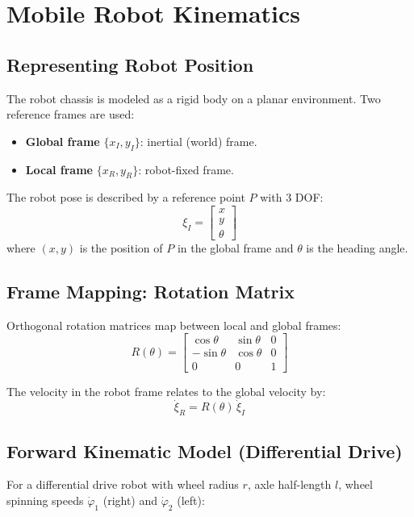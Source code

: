 \documentclass[11pt,a4paper]{article}
\theoremstyle{definition}
\theoremstyle{plain}
\theoremstyle{remark}
\begin{document}
\section{Mobile Robot Kinematics}

\subsection{Representing Robot Position}

The robot chassis is modeled as a rigid body on a planar environment. Two reference frames are used:
\begin{itemize}
    \item \textbf{Global frame} $\{x_I, y_I\}$: inertial (world) frame.
    \item \textbf{Local frame} $\{x_R, y_R\}$: robot-fixed frame.
\end{itemize}

The robot pose is described by a reference point $P$ with 3 DOF:
\[
\xi_I = \begin{bmatrix} x \\ y \\ \theta \end{bmatrix}
\]
where $(x, y)$ is the position of $P$ in the global frame and $\theta$ is the heading angle.

\subsection{Frame Mapping: Rotation Matrix}

Orthogonal rotation matrices map between local and global frames:
\[
R(\theta) = \begin{bmatrix} \cos\theta & \sin\theta & 0 \\ -\sin\theta & \cos\theta & 0 \\ 0 & 0 & 1 \end{bmatrix}
\]

The velocity in the robot frame relates to the global velocity by:
\[
\dot{\xi}_R = R(\theta)\,\dot{\xi}_I
\]

\subsection{Forward Kinematic Model (Differential Drive)}

For a differential drive robot with wheel radius $r$, axle half-length $l$, wheel spinning speeds $\dot{\varphi}_1$ (right) and $\dot{\varphi}_2$ (left):
\end{document}
